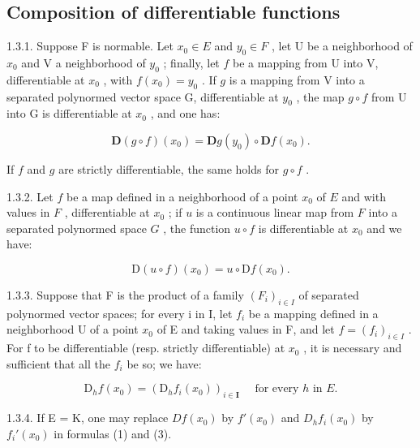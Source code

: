 \subsection{Composition of differentiable functions}

1.3.1. Suppose F is normable. Let \(x_0 \in E\) and \(y_0 \in F\) , let U be a neighborhood of \(x_0\) and V a neighborhood of \(y_0\) ; finally, let \(f\) be a mapping from U into V, differentiable at \(x_0\) , with \(f(x_0) = y_0\) . If \(g\) is a mapping from V into a separated polynormed vector space G, differentiable at \(y_0\) , the map \(g \circ f\) from U into G is differentiable at \(x_0\) , and one has:

\[
\mathbf {D} (g \circ f) (x _ {0}) = \mathbf {D} g (y _ {0}) \circ \mathbf {D} f (x _ {0}).\tag{1}
\]

If \(f\) and \(g\) are strictly differentiable, the same holds for \(g \circ f\) .

1.3.2. Let \(f\) be a map defined in a neighborhood of a point \(x_0\) of \(E\) and with values in \(F\) , differentiable at \(x_0\) ; if \(u\) is a continuous linear map from \(F\) into a separated polynormed space \(G\) , the function \(u \circ f\) is differentiable at \(x_0\) and we have:

\[
\mathrm{D} (u \circ f) (x _ {0}) = u \circ \mathrm{D} f (x _ {0}).\tag{2}
\]

1.3.3. Suppose that F is the product of a family \((F_{i})_{i\in I}\) of separated polynormed vector spaces; for every i in I, let \(f_{i}\) be a mapping defined in a neighborhood U of a point \(x_{0}\) of E and taking values in F, and let \(f = (f_{i})_{i\in I}\) . For f to be differentiable (resp. strictly differentiable) at \(x_{0}\) , it is necessary and sufficient that all the \(f_{i}\) be so; we have:

\[
\mathrm{D} _ {h} f (x _ {0}) = (\mathrm{D} _ {h} f _ {i} (x _ {0})) _ {i \in \mathbf {I}} \quad \text { for   every } h \text { in } E.\tag{3}
\]

1.3.4. If E = K, one may replace \(Df(x_{0})\) by \(f'(x_{0})\) and \(D_{h}f_{i}(x_{0})\) by \(f_{i}'(x_{0})\) in formulas (1) and (3).

